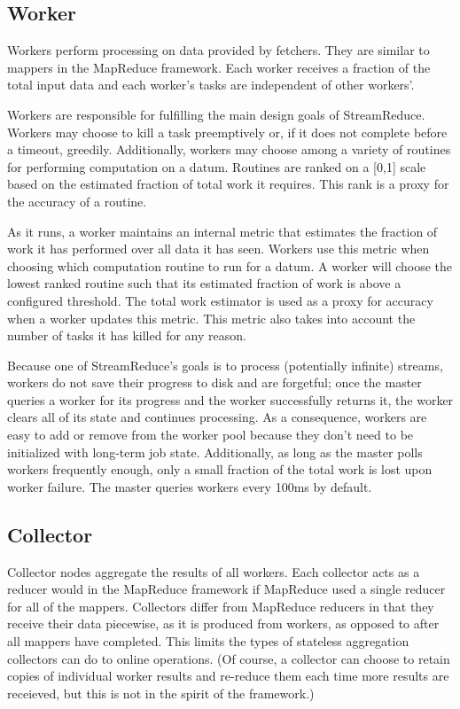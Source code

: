 \documentclass[12pt,twocolumn]{article}
\begin{document}
\subsection{Worker}
Workers perform processing on data provided by fetchers. They are similar to mappers
in the MapReduce framework. Each worker receives a fraction of the total input data
and each worker's tasks are independent of other workers'.

Workers are responsible for fulfilling the main design goals of StreamReduce. Workers may choose
to kill a task preemptively or, if it does not complete before a timeout, greedily. Additionally,
workers may choose among a variety of routines for performing computation on a datum.
Routines are ranked on a [0,1] scale based on the estimated fraction of total work it
requires. This rank is a proxy for the accuracy of a routine.

As it runs, a worker maintains an internal metric that estimates the fraction of work
it has performed over all data it has seen. Workers use this metric when choosing which
computation routine to run for a datum. A worker will choose the lowest ranked routine
such that its estimated fraction of work is above a configured threshold.
The total work estimator is used as a proxy for accuracy when a worker updates
this metric. This metric also takes into account the number of tasks it has killed
for any reason.

Because one of StreamReduce's goals is to process (potentially infinite) streams, workers do not
save their progress to disk and are forgetful; once the master queries a worker for its
progress and the worker successfully returns it, the worker clears all of its state and
continues processing. As a consequence, workers are easy to add or remove from the worker
pool because they don't need to be initialized with long-term job state. Additionally, as
long as the master polls workers frequently enough, only a small
fraction of the total work is lost upon worker failure.
The master queries workers every 100ms by default.
\subsection{Collector}
Collector nodes aggregate the results of all workers. Each collector acts as a reducer would
in the MapReduce framework if MapReduce used a single reducer for all of the mappers.
Collectors differ from MapReduce reducers in that they receive their data piecewise, as it
is produced from workers, as opposed to after all mappers have completed. This limits the
types of stateless aggregation collectors can do to online operations. (Of course, a collector
can choose to retain copies of individual worker results and re-reduce them each time more
results are receieved, but this is not in the spirit of the framework.)
\end{document}
